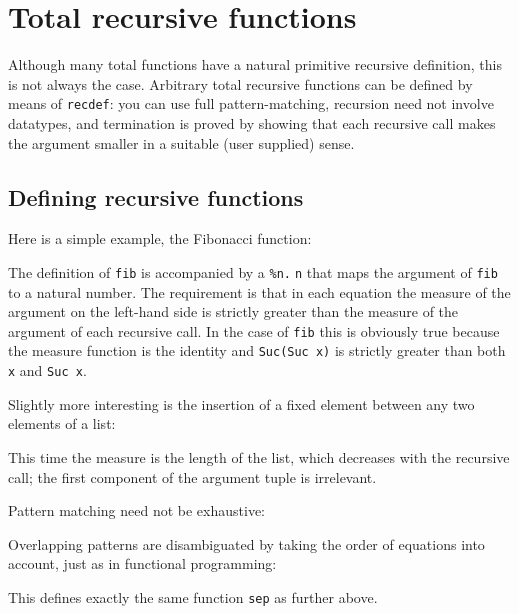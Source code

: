 \section{Total recursive functions}
\label{sec:recdef}


Although many total functions have a natural primitive recursive definition,
this is not always the case. Arbitrary total recursive functions can be
defined by means of \texttt{recdef}: you can use full pattern-matching,
recursion need not involve datatypes, and termination is proved by showing
that each recursive call makes the argument smaller in a suitable (user
supplied) sense.

\subsection{Defining recursive functions}

Here is a simple example, the Fibonacci function:
\begin{ttbox}
\end{ttbox}
The definition of \texttt{fib} is accompanied by a 
\texttt{\%n.$\;$n} that maps the argument of \texttt{fib} to a natural
number. The requirement is that in each equation the measure of the argument
on the left-hand side is strictly greater than the measure of the argument of
each recursive call. In the case of \texttt{fib} this is obviously true
because the measure function is the identity and \texttt{Suc(Suc~x)} is
strictly greater than both \texttt{x} and \texttt{Suc~x}.

Slightly more interesting is the insertion of a fixed element
between any two elements of a list:
\begin{ttbox}
\end{ttbox}
This time the measure is the length of the list, which decreases with the
recursive call; the first component of the argument tuple is irrelevant.

Pattern matching need not be exhaustive:
\begin{ttbox}
\end{ttbox}

Overlapping patterns are disambiguated by taking the order of equations into
account, just as in functional programming:
\begin{ttbox}
\end{ttbox}
This defines exactly the same function \texttt{sep} as further above.


